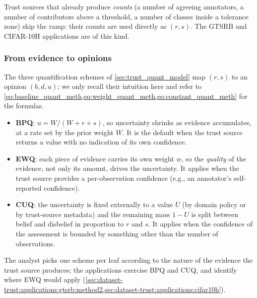 Trust sources that already produce \emph{counts} (a number of agreeing annotators, a number of contributors above a threshold, a number of classes inside a tolerance zone) skip the ramp: their counts are used directly as $(r, s)$. The \ac{GTSRB} and CIFAR-10H applications are of this kind.

\subsubsection{From evidence to opinions}
\label{sec:dataset-trust:formal:quantification}
The three quantification schemes of \cref{sec:trust_quant_model} map $(r, s)$ to an opinion $(b, d, u)$; we only recall their intuition here and refer to \cref{eq:baseline_quant_meth,eq:weight_quant_meth,eq:constant_quant_meth} for the formulas.
\begin{itemize}
  \item \textbf{\acf{BPQ}}: $u = W/(W + r + s)$, so uncertainty shrinks as evidence accumulates, at a rate set by the prior weight $W$. It is the default when the trust source returns a value with no indication of its own confidence.
  \item \textbf{\acf{EWQ}}: each piece of evidence carries its own weight $w$, so the \emph{quality} of the evidence, not only its amount, drives the uncertainty. It applies when the trust source provides a per-observation confidence (e.g., an annotator's self-reported confidence).
  \item \textbf{\acf{CUQ}}: the uncertainty is fixed externally to a value $U$ (by domain policy or by trust-source metadata) and the remaining mass $1-U$ is split between belief and disbelief in proportion to $r$ and $s$. It applies when the confidence of the assessment is bounded by something other than the number of observations.
\end{itemize}
The analyst picks one scheme per leaf according to the nature of the evidence the trust source produces; the applications exercise BPQ and CUQ, and identify where EWQ would apply (\cref{sec:dataset-trust:applications:gtsrb:method2,sec:dataset-trust:applications:cifar10h}).


